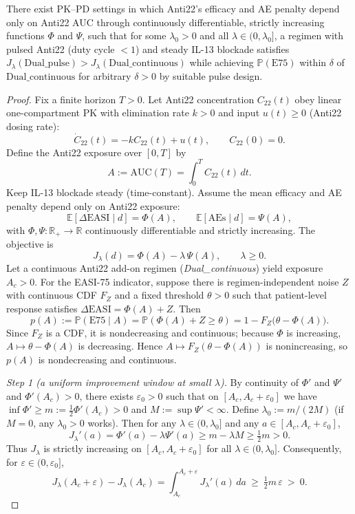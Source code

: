 ﻿\begin{theorem}\label{thm:pulse-superiority}
There exist PK--PD settings in which Anti22's efficacy and AE penalty depend only on Anti22 AUC through continuously differentiable, strictly increasing functions \(\Phi\) and \(\Psi\), such that for some \(\lambda_0>0\) and all \(\lambda\in(0,\lambda_0]\), a regimen with pulsed Anti22 (duty cycle $<1$) and steady IL-13 blockade satisfies \(J_\lambda(\mathrm{Dual\_pulse})>J_\lambda(\mathrm{Dual\_continuous})\) while achieving \(\mathbb P(\mathrm{E75})\) within \(\delta\) of \(\mathrm{Dual\_continuous}\) for arbitrary \(\delta>0\) by suitable pulse design.
\end{theorem}

\begin{proof}
Fix a finite horizon $T>0$. Let Anti22 concentration $C_{22}(t)$ obey linear one-compartment PK with elimination rate $k>0$ and input $u(t)\ge 0$ (Anti22 dosing rate):
\[\dot C_{22}(t)=-kC_{22}(t)+u(t),\qquad C_{22}(0)=0.\]
Define the Anti22 exposure over $[0,T]$ by
\[A:=\mathrm{AUC}(T)=\int_0^T C_{22}(t)\,dt.\]
Keep IL-13 blockade steady (time-constant). Assume the mean efficacy and AE penalty depend only on Anti22 exposure:
\[\mathbb E[\Delta\mathrm{EASI}\mid d]=\Phi(A),\qquad \mathbb E[\mathrm{AEs}\mid d]=\Psi(A),\]
with $\Phi,\Psi:\mathbb R_+\to\mathbb R$ continuously differentiable and strictly increasing. The objective is
\[J_\lambda(d)=\Phi(A)-\lambda\,\Psi(A),\qquad \lambda\ge 0.\]
Let a continuous Anti22 add-on regimen (\emph{Dual\_continuous}) yield exposure $A_c>0$. For the EASI-75 indicator, suppose there is regimen-independent noise $Z$ with continuous CDF $F_Z$ and a fixed threshold $\theta>0$ such that patient-level response satisfies $\Delta\mathrm{EASI}=\Phi(A)+Z$. Then
\[p(A):=\mathbb P(\mathrm{E75}\mid A)=\mathbb P(\Phi(A)+Z\ge\theta)=1-F_Z\big(\theta-\Phi(A)\big).\]
Since $F_Z$ is a CDF, it is nondecreasing and continuous; because $\Phi$ is increasing, $A\mapsto \theta-\Phi(A)$ is decreasing. Hence $A\mapsto F_Z(\theta-\Phi(A))$ is nonincreasing, so $p(A)$ is nondecreasing and continuous.

\emph{Step 1 (a uniform improvement window at small $\lambda$).} By continuity of $\Phi'$ and $\Psi'$ and $\Phi'(A_c)>0$, there exists $\varepsilon_0>0$ such that on $[A_c,A_c+\varepsilon_0]$ we have $\inf \Phi'\ge m:=\tfrac12\Phi'(A_c)>0$ and $M:=\sup \Psi'<\infty$. Define $\lambda_0:=m/(2M)$ (if $M=0$, any $\lambda_0>0$ works). Then for any $\lambda\in(0,\lambda_0]$ and any $a\in[A_c,A_c+\varepsilon_0]$,
\[J_\lambda'(a)=\Phi'(a)-\lambda\Psi'(a)\ge m-\lambda M\ge \tfrac12 m>0.\]
Thus $J_\lambda$ is strictly increasing on $[A_c,A_c+\varepsilon_0]$ for all $\lambda\in(0,\lambda_0]$. Consequently, for $\varepsilon\in(0,\varepsilon_0]$,
\[J_\lambda(A_c+\varepsilon)-J_\lambda(A_c)=\int_{A_c}^{A_c+\varepsilon}J_\lambda'(a)\,da\ \ge\ \tfrac12 m\,\varepsilon\ >\ 0.\]


\end{proof}
